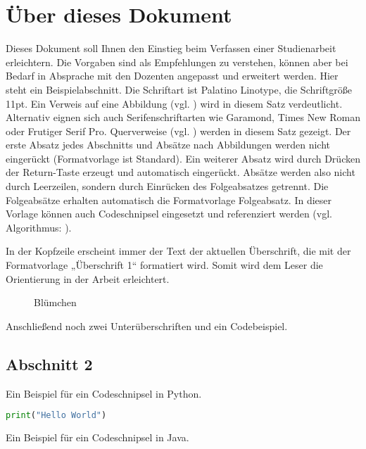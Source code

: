 \documentclass{mi-graduation}
\begin{document}
\section{Über dieses Dokument}
Dieses Dokument soll Ihnen den Einstieg beim Verfassen einer Studienarbeit erleichtern. Die Vorgaben sind als Empfehlungen zu verstehen, können aber bei Bedarf in Absprache mit den Dozenten angepasst und erweitert werden. Hier steht ein Beispielabschnitt. Die Schriftart ist Palatino Linotype, die Schriftgröße 11pt. Ein Verweis auf eine Abbildung (vgl. ) wird in diesem Satz verdeutlicht. Alternativ eignen sich auch Serifenschriftarten wie Garamond, Times New Roman oder Frutiger Serif Pro. Querverweise (vgl. ) werden in diesem Satz  gezeigt. Der erste Absatz jedes Abschnitts und Absätze nach Abbildungen werden nicht eingerückt (Formatvorlage ist Standard). Ein weiterer Absatz wird durch Drücken der Return-Taste erzeugt und automatisch eingerückt. Absätze werden also nicht durch Leerzeilen, sondern durch Einrücken des Folgeabsatzes getrennt. Die Folgeabsätze erhalten automatisch die Formatvorlage Folgeabsatz.
In dieser Vorlage können auch Codeschnipsel eingesetzt und referenziert werden (vgl. Algorithmus: ).

In der Kopfzeile erscheint immer der Text der aktuellen Überschrift, die mit der Formatvorlage „Überschrift 1“ formatiert wird. Somit wird dem Leser die Orientierung in der Arbeit erleichtert.\\

\begin{figure}[h!]
	\caption{Blümchen \citep{Norman:2002}}
	\label{img:norman2010}
\end{figure}

Anschließend noch zwei Unterüberschriften und ein Codebeispiel.

\subsection{Abschnitt 2}\label{section:2}
Ein Beispiel für ein Codeschnipsel in Python.\\

\begin{lstlisting}[captionpos=b, belowcaptionskip=4pt, caption=Hello World (Python), label=helloworld, language=Python]
print("Hello World")
\end{lstlisting}

Ein Beispiel für ein Codeschnipsel in Java.\\
\end{document}
